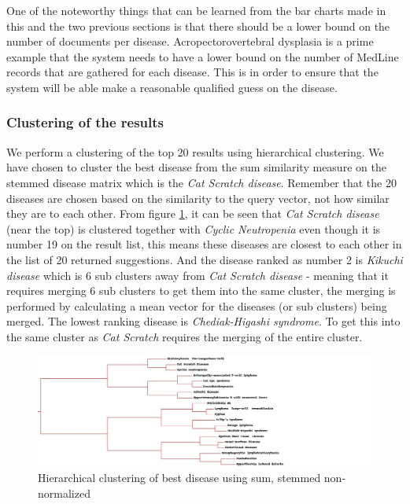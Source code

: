 One of the noteworthy things that can be learned from the bar charts made in this and 
the two previous sections is that there should be a lower bound on the number of documents 
per disease. Acropectorovertebral dysplasia is a prime example that the system needs to 
have a lower bound on the number of MedLine records that are gathered for each disease. 
This is in order to ensure that the system will be able make a reasonable qualified guess 
on the disease.

\subsubsection{Clustering of the results}

We perform a clustering of the top 20 results using hierarchical
clustering. We have chosen to cluster the best disease from the sum
similarity measure on the stemmed disease matrix which is the
\textit{Cat Scratch disease}. Remember that the 20 diseases are chosen
based on the similarity to the query vector, not how similar they are
to each other. From figure
\ref{sum_stem_top20_best_cat_scratch_disease}, it can be seen that
\textit{Cat Scratch disease} (near the top) is clustered together with
\textit{Cyclic Neutropenia} even though it is number 19 on the result
list, this means these diseases are closest to each other in the list
of 20 returned suggestions. And the disease ranked as number 2 is
\textit{Kikuchi disease} which is 6 sub clusters away from \textit{Cat
  Scratch disease} - meaning that it requires merging 6 sub clusters
to get them into the same cluster, the merging is performed by
calculating a mean vector for the diseases (or sub clusters) being
merged. The lowest ranking disease is \textit{Chediak-Higashi
  syndrome}. To get this into the same cluster as \textit{Cat Scratch}
requires the merging of the entire cluster.

\begin{figure}[H]
  \begin{center}
    \includegraphics[width=1.3\textwidth]{clusters/sum_stem_top20_best_cat_scratch_disease.jpg}
  \end{center}
  \caption{Hierarchical clustering of best disease using sum, stemmed non-normalized}
  \label{sum_stem_top20_best_cat_scratch_disease}
\end{figure}


